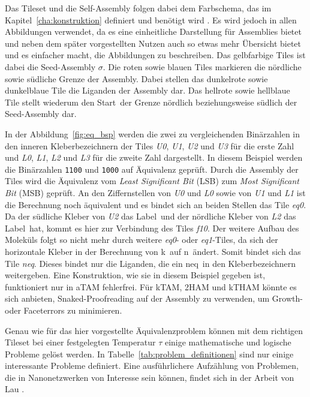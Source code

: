 Das Tileset und die Self-Assembly folgen dabei dem Farbschema, das im Kapitel~\ref{cha:konstruktion} definiert und benötigt wird \cite{braun2018uzlcolor}. Es wird jedoch in allen Abbildungen verwendet, da es eine einheitliche Darstellung für Assemblies bietet und neben dem später vorgestellten Nutzen auch so etwas mehr Übersicht bietet und es einfacher macht, die Abbildungen zu beschreiben.
Das gelbfarbige Tiles ist dabei die Seed-Assembly \emph{$\sigma$}. Die roten sowie blauen Tiles markieren die nördliche sowie südliche Grenze der Assembly. Dabei stellen das dunkelrote sowie dunkelblaue Tile die Liganden der Assembly dar. Das hellrote sowie hellblaue Tile stellt wiederum den \glqq Start\grqq\, der Grenze nördlich beziehungsweise südlich der Seed-Assembly dar.

In der Abbildung~\ref{fig:eq_bsp} werden die zwei zu vergleichenden Binärzahlen in den inneren Kleberbezeichnern der Tiles \emph{U0}, \emph{U1}, \emph{U2} und \emph{U3} für die erste Zahl und \emph{L0}, \emph{L1}, \emph{L2} und \emph{L3} für die zweite Zahl dargestellt.
In diesem Beispiel werden die Binärzahlen \texttt{1100} und \texttt{1000} auf Äquivalenz geprüft. 
Durch die Assembly der Tiles wird die Äquivalenz vom \emph{Least Significant Bit} (LSB) zum \emph{Most Significant Bit} (MSB) geprüft.
An den Ziffernstellen von \emph{U0} und \emph{L0} sowie von \emph{U1} und \emph{L1} ist die Berechnung noch äquivalent und es bindet sich an beiden Stellen das Tile \emph{eq0}.
Da der südliche Kleber von \emph{U2} das Label \grqq\,und der nördliche Kleber von \emph{L2} das Label \grqq\,hat, kommt es hier zur Verbindung des Tiles \emph{f10}.
Der weitere Aufbau des Moleküls folgt so nicht mehr durch weitere \emph{eq0}- oder \emph{eq1}-Tiles, da sich der horizontale Kleber in der Berechnung von \glqq k\grqq\, auf \glqq n\grqq\, ändert.
Somit bindet sich das Tile \emph{neq}. Dieses bindet nur die Liganden, die ein \glqq neq\grqq\, in den Kleberbezeichnern weitergeben.
Eine Konstruktion, wie sie in diesem Beispiel gegeben ist, funktioniert nur in aTAM fehlerfrei. 
Für kTAM, 2HAM und kTHAM könnte es sich anbieten, Snaked-Proofreading auf der Assembly zu verwenden, um Growth- oder Faceterrors zu minimieren.

Genau wie für das hier vorgestellte Äquivalenzproblem können mit dem richtigen Tileset bei einer festgelegten Temperatur $\tau$ einige mathematische und logische Probleme gelöst werden.
In Tabelle~\ref{tab:problem_definitionen} sind nur einige interessante Probleme definiert.
Eine ausführlichere Aufzählung von Problemen, die in Nanonetzwerken von Interesse sein können, findet sich in der Arbeit von Lau \cite{lau2020phd}.

